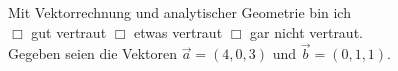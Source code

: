 \documentclass[12pt,answers]{exam}
\begin{document}
\begin{questions}
%
%
%
%
%
%
%
%
%
%
%
%
\pagebreak
{}

Mit Vektorrechnung und analytischer Geometrie bin ich \\ $\Box$ gut vertraut \hfill $\Box$ etwas vertraut \hfill $\Box$ gar nicht vertraut. \\[2ex]
Gegeben seien die Vektoren $\vec{a}=(4,0,3)$ und $\vec{b}=(0,1,1)$.


\end{questions}
\end{document}
